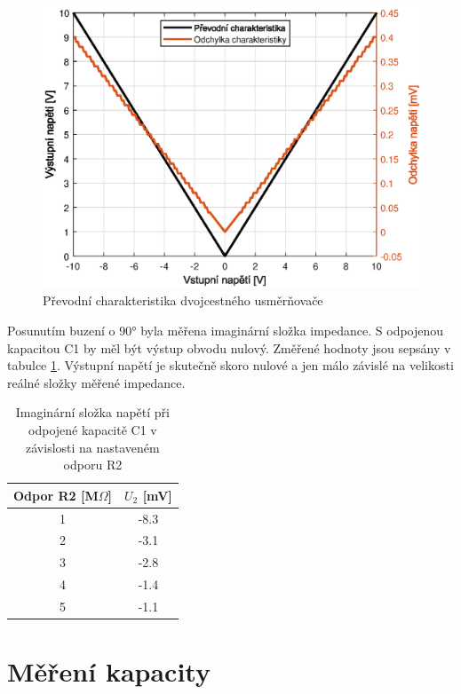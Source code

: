 \documentclass[twoside]{article}
\begin{document}
\begin{figure}[h]
    \centering
    \includegraphics[width=\textwidth]{char-dvoucest-usmernovac.eps}
    \caption{Převodní charakteristika dvojcestného usměrňovače}
    \label{dvoucest-usmernovac}
\end{figure}

Posunutím buzení o 90° byla měřena imaginární složka impedance.
S odpojenou kapacitou C1 by měl být výstup obvodu nulový.
Změřené hodnoty jsou sepsány v tabulce \ref{odpojene-c-imag}.
Výstupní napětí je skutečně skoro nulové a jen
málo závislé na velikosti reálné složky měřené impedance.
\begin{table}[h]
    \centering
    \begin{tabular}{c|c}
        Odpor R2 [M$\Omega$] & $U_2$ [mV] \\ \hline
        1 & -8.3 \\ 
        2 & -3.1 \\ 
        3 & -2.8 \\ 
        4 & -1.4 \\ 
        5 & -1.1 \\ 
    \end{tabular}
    \caption{Imaginární složka napětí při odpojené kapacitě C1 v závislosti na nastaveném odporu R2}
    \label{odpojene-c-imag}
\end{table}
\clearpage

\section{Měření kapacity}
\end{document}

